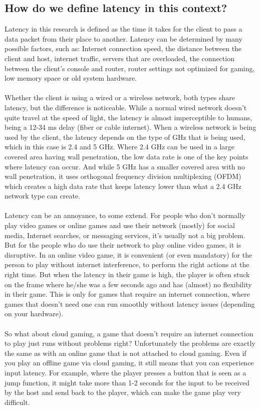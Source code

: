 \subsection{How do we define latency in this context?}
Latency in this research is defined as the time it takes for the client to pass a data packet from their place to another. Latency can be determined by many possible factors, such as: Internet connection speed, the distance between the client and host, internet traffic, servers that are overloaded, the connection between the client's console and router, router settings not optimized for gaming, low memory space or old system hardware.\\\\
Whether the client is using a wired or a wireless network, both types share latency, but the difference is noticeable. While a normal wired network doesn't quite travel at the speed of light, the latency is almost imperceptible to humans, being a 12-34 ms delay (fiber or cable internet). When a wireless network is being used by the client, the latency depends on the type of GHz that is being used, which in this case is 2.4 and 5 GHz. Where 2.4 GHz can be used in a large covered area having wall penetration, the low data rate is one of the key points where latency can occur. And while 5 GHz has a smaller covered area with no wall penetration, it uses orthogonal frequency division multiplexing (OFDM) which creates a high data rate that keeps latency lower than what a 2.4 GHz network type can create.\\\\
Latency can be an annoyance, to some extend. For people who don't normally play video games or online games and use their network (mostly) for social media, Internet searches, or messaging services, it's usually not a big problem. But for the people who do use their network to play online video games, it is disruptive. In an online video game, it is convenient (or even mandatory) for the person to play without internet interference, to perform the right actions at the right time. But when the latency in their game is high, the player is often stuck on the frame where he/she was a few seconds ago and has (almost) no flexibility in their game. This is only for games that require an internet connection, where games that doesn't need one can run smoothly without latency issues (depending on your hardware).\\\\
So what about cloud gaming, a game that doesn't require an internet connection to play just runs without problems right? Unfortunately the problems are exactly the same as with an online game that is not attached to cloud gaming. Even if you play an offline game via cloud gaming, it still means that you can experience input latency. For example, where the player presses a button that is seen as a jump function, it might take more than 1-2 seconds for the input to be received by the host and send back to the player, which can make the game play very difficult.
